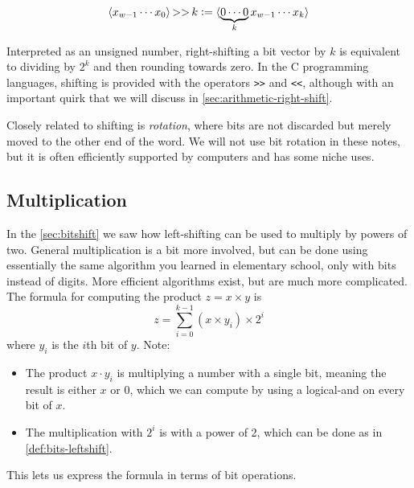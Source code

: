 \begin{definition}
  \begin{align*}
    \langle x_{w-1}\cdots{}x_{0} \rangle \operatorname{>>} k \vcentcolon=
    \langle \underbrace{0 \cdots 0}_{k} x_{w-1}\cdots{}x_{k} \rangle
  \end{align*}
  \label{def:bits-rightshift-logical}
\end{definition}

Interpreted as an unsigned number, right-shifting a bit vector by $k$
is equivalent to dividing by $2^{k}$ and then rounding towards zero.
In the C programming languages, shifting is provided with the
operators \texttt{>>} and \texttt{<<}, although with an important
quirk that we will discuss in \cref{sec:arithmetic-right-shift}.

Closely related to shifting is \emph{rotation}, where bits are not
discarded but merely moved to the other end of the word.  We will not
use bit rotation in these notes, but it is often efficiently supported
by computers and has some niche uses.

\subsection{Multiplication}
\label{sec:bit-multiplication}

In the \cref{sec:bitshift} we saw how left-shifting can be used to
multiply by powers of two.  General multiplication is a bit more
involved, but can be done using essentially the same algorithm you
learned in elementary school, only with bits instead of digits.  More
efficient algorithms exist, but are much more complicated.  The
formula for computing the product $z=x\times{}y$ is
\begin{equation}
  z = \sum_{i=0}^{k-1} (x \times y_{i}) \times 2^{i}
\end{equation}
where $y_{i}$ is the $i$th bit of $y$.  Note:
\begin{itemize}
\item The product $x \cdot y_{i}$ is multiplying a number with a
  single bit, meaning the result is either $x$ or $0$, which we can
  compute by using a logical-and on every bit of $x$.
\item The multiplication with $2^{i}$ is with a power of 2, which can
  be done as in \cref{def:bits-leftshift}.
\end{itemize}

This lets us express the formula in terms of bit operations.

